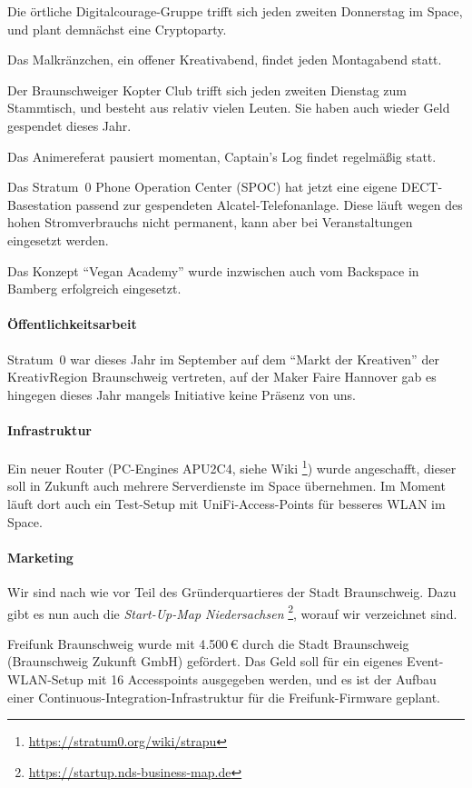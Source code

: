 \documentclass{s0minutes}
\begin{document}
Die örtliche Digitalcourage-Gruppe trifft sich jeden zweiten Donnerstag im
Space, und plant demnächst eine Cryptoparty.

Das Malkränzchen, ein offener Kreativabend, findet jeden Montagabend statt.

Der Braunschweiger Kopter Club trifft sich jeden zweiten Dienstag zum
Stammtisch, und besteht aus relativ vielen Leuten. Sie haben auch wieder Geld
gespendet dieses Jahr.

Das Animereferat pausiert momentan, Captain's Log findet regelmäßig statt.

Das Stratum~0 Phone Operation Center (SPOC) hat jetzt eine eigene
DECT-Basestation passend zur gespendeten Alcatel-Telefonanlage. Diese läuft
wegen des hohen Stromverbrauchs nicht permanent, kann aber bei Veranstaltungen
eingesetzt werden.

Das Konzept "`Vegan Academy"' wurde inzwischen auch vom Backspace in Bamberg
erfolgreich eingesetzt.

\paragraph{Öffentlichkeitsarbeit}

Stratum~0 war dieses Jahr im September auf dem "`Markt der Kreativen"' der
KreativRegion Braunschweig vertreten, auf der Maker Faire Hannover gab es
hingegen dieses Jahr mangels Initiative keine Präsenz von uns.

\paragraph{Infrastruktur}

Ein neuer Router (PC-Engines APU2C4, siehe Wiki%
\footnote{\url{https://stratum0.org/wiki/strapu}}) wurde angeschafft, dieser
soll in Zukunft auch mehrere Serverdienste im Space übernehmen. Im Moment läuft
dort auch ein Test-Setup mit UniFi-Access-Points für besseres WLAN im Space.

\paragraph{Marketing}

Wir sind nach wie vor Teil des Gründerquartieres der Stadt Braunschweig. Dazu
gibt es nun auch die \emph{Start-Up-Map Niedersachsen}%
\footnote{\url{https://startup.nds-business-map.de}}, worauf wir verzeichnet
sind.

Freifunk Braunschweig wurde mit 4{.}500\,€ durch die Stadt Braunschweig
(Braunschweig Zukunft GmbH) gefördert. Das Geld soll für ein eigenes
Event-WLAN-Setup mit 16 Accesspoints ausgegeben werden, und es ist der Aufbau
einer Continuous-Integration-Infrastruktur für die Freifunk-Firmware geplant.
\end{document}
